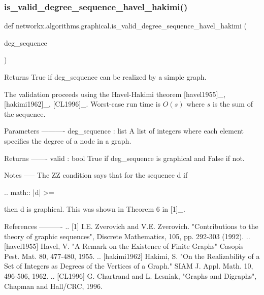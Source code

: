  \mbox{\label{namespacenetworkx_1_1algorithms_1_1graphical_ae89906b429041d2b846aa372fdc4a427}} 
\subsubsection{\texorpdfstring{is\+\_\+valid\+\_\+degree\+\_\+sequence\+\_\+havel\+\_\+hakimi()}{is\_valid\_degree\_sequence\_havel\_hakimi()}}
{\footnotesize\ttfamily def networkx.\+algorithms.\+graphical.\+is\+\_\+valid\+\_\+degree\+\_\+sequence\+\_\+havel\+\_\+hakimi (\begin{DoxyParamCaption}\item[{}]{deg\+\_\+sequence }\end{DoxyParamCaption})}

\begin{DoxyVerb}Returns True if deg_sequence can be realized by a simple graph.

The validation proceeds using the Havel-Hakimi theorem
[havel1955]_, [hakimi1962]_, [CL1996]_.
Worst-case run time is $O(s)$ where $s$ is the sum of the sequence.

Parameters
----------
deg_sequence : list
    A list of integers where each element specifies the degree of a node
    in a graph.

Returns
-------
valid : bool
    True if deg_sequence is graphical and False if not.

Notes
-----
The ZZ condition says that for the sequence d if

.. math::
    |d| >= 

then d is graphical.  This was shown in Theorem 6 in [1]_.

References
----------
.. [1] I.E. Zverovich and V.E. Zverovich. "Contributions to the theory
   of graphic sequences", Discrete Mathematics, 105, pp. 292-303 (1992).
.. [havel1955] Havel, V. "A Remark on the Existence of Finite Graphs"
   Casopis Pest. Mat. 80, 477-480, 1955.
.. [hakimi1962] Hakimi, S. "On the Realizability of a Set of Integers as
   Degrees of the Vertices of a Graph." SIAM J. Appl. Math. 10, 496-506, 1962.
.. [CL1996] G. Chartrand and L. Lesniak, "Graphs and Digraphs",
   Chapman and Hall/CRC, 1996.
\end{DoxyVerb}
 